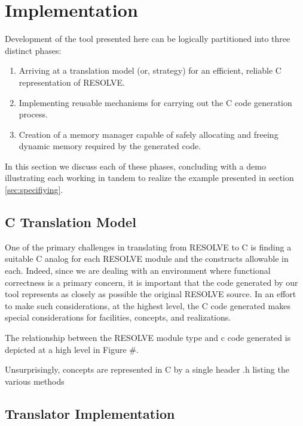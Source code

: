 \documentclass{sig-alternate}
\begin{document}
\section{Implementation}
Development of the tool presented here can be logically partitioned into three distinct phases: 
\begin{enumerate}
\item Arriving at a translation model (or, strategy) for an efficient, reliable C representation of RESOLVE.
\item Implementing reusable mechanisms for carrying out the C code generation process.
\item Creation of a memory manager capable of safely allocating and freeing dynamic memory required by the generated code.
\end{enumerate}
In this section we discuss each of these phases, concluding with a demo illustrating each working in tandem to realize the example presented in section \ref{sec:specifiying}.

\subsection{C Translation Model}
One of the primary challenges in translating from RESOLVE to C is finding a suitable C analog for each RESOLVE module and the constructs allowable in each. Indeed, since we are dealing with an environment where functional correctness is a primary concern, it is important that the code generated by our tool represents as closely as possible the original RESOLVE source. In an effort to make such considerations, at the highest level, the C code generated makes special considerations for facilities, concepts, and realizations.

The relationship between the RESOLVE module type and c code generated is depicted at a high level in Figure \#.

Unsurprisingly, concepts are represented in C by a single header .h listing the various methods 



\subsection{Translator Implementation}
\end{document}
